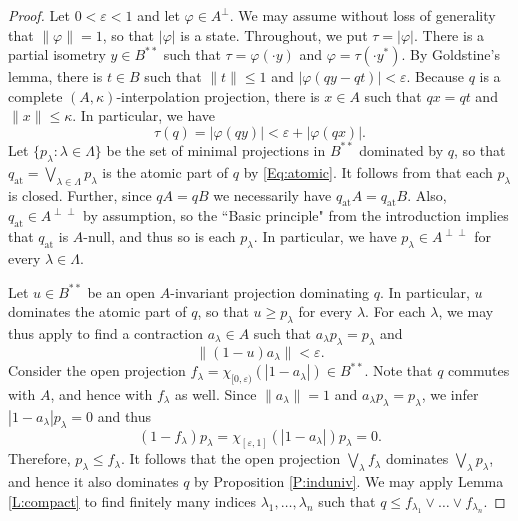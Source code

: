 \documentclass[10pt]{amsart}
\newcommand{\eps}{\varepsilon}
\renewcommand{\phi}{\varphi}
\newcommand{\at}{\operatorname{at}}
\theoremstyle{definition}
\begin{document}
 \begin{proof}
 Let $0<\eps<1$ and let $\phi\in A^\perp$. We may assume without loss of generality that $\|\phi\|=1$, so that $|\phi|$ is a state. Throughout, we put $\tau=|\phi|$. There is a partial isometry $y\in B^{**}$ such that $\tau=\phi(\cdot y)$ and $\phi=\tau(\cdot y^*)$. By Goldstine's lemma, there is $t\in B$ such that $\|t\|\leq 1$ and  $|\phi(qy-qt)|<\eps.$
 Because $q$ is a complete $(A,\kappa)$-interpolation projection, there is $x\in A$ such that $qx=qt$ and $\|x\|\leq \kappa$.  In particular, we have
 \begin{equation}\label{Eq:pisom}
 \tau(q) =|\phi(qy)|< \eps+|\phi(qx)|.
 \end{equation}
Let $\{p_\lambda:\lambda\in \Lambda\}$ be the set of minimal projections in $B^{**}$ dominated by $q$, so that $q_{\at}=\bigvee_{\lambda\in \Lambda} p_\lambda$ is the atomic part of $q$ by \eqref{Eq:atomic}.
 It follows from \cite[Proposition II.4]{akemann1969} that each $p_\lambda$ is closed. Further, since $qA=qB$ we necessarily have $q_{\at}A=q_{\at}B$. Also, $q_{\at}\in A^{\perp\perp}$ by assumption, so the 
 ``Basic principle" from the introduction
  implies that $q_{\at}$ is $A$-null, and thus so is each $p_{\lambda}$. In particular, we have $p_\lambda\in A^{\perp\perp}$ for every $\lambda\in \Lambda$.

Let $u\in B^{**}$ be an open $A$-invariant projection dominating $q$. In particular, $u$ dominates the atomic part of $q$, so that $u\geq p_\lambda$ for every $\lambda$.  For each $\lambda$, we may thus apply \cite[Theorem 2.1]{BN2012} to find a contraction $a_\lambda\in A$ such that $a_\lambda p_\lambda=p_\lambda$ and 
\begin{equation}\label{Eq:norm1-u}
 \|(1-u)a_\lambda\|<\eps.
\end{equation}
Consider the open  projection $f_\lambda=\chi_{[0,\eps)}(|1-a_\lambda|)\in B^{**}$. Note that $q$ commutes with $A$, and hence with $f_\lambda$ as well.
Since $\|a_\lambda\|=1$ and $a_\lambda p_\lambda=p_\lambda$, we infer  $|1-a_\lambda| p_\lambda=0$ and thus 
\[
(1-f_\lambda)p_\lambda=\chi_{[\eps,1]}(|1-a_\lambda|)p_\lambda=0.
\] 
Therefore, $p_\lambda\leq f_\lambda$. 
It follows that the open projection $\bigvee_{\lambda}f_\lambda$ dominates $\bigvee_{\lambda}p_\lambda$, and hence it also dominates $q$ by Proposition \ref{P:induniv}. We may apply  Lemma \ref{L:compact} to find finitely many indices $\lambda_1,\ldots,\lambda_n$ such that $q\leq f_{\lambda_1}\vee \ldots \vee f_{\lambda_n}$.  




\end{proof}
\end{document}
